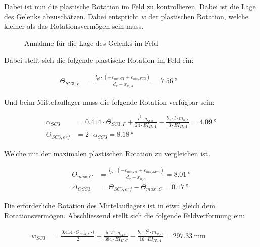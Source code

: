 \documentclass[
  11pt,
  letterpaper,
]{scrreprt}
\begin{document}
Dabei ist nun die plastische Rotation im Feld zu kontrollieren. Dabei
ist die Lage des Gelenks abzuschätzen. Dabei entspricht \(w\) der
plastischen Rotation, welche kleiner als das Rotationsvermögen sein
muss.

\begin{figure}[H]


\caption{\label{fig-jag_plast_feld_C}Annahme für die Lage des Gelenks im
Feld}

\end{figure}%

Dabei stellt sich die folgende plastische Rotation im Feld ein:

\[
\begin{aligned}
\Theta_{SC3 , F}& = \frac{l_{pl} \cdot \left(- \varepsilon_{m s , C1} + \varepsilon_{m s , SC3}\right)}{d_{x} - x_{u , A}} = 7.56 \ \mathrm{°} \quad &  \quad &  
 \end{aligned}
\]

Und beim Mittelauflager muss die folgende Rotation verfügbar sein:

\[
\begin{aligned}
\alpha_{SC3}& = 0.414 \cdot \Theta_{SC3 , F} + \frac{l^{3} \cdot q_{SC3}}{24 \cdot EI_{II , A}} - \frac{b_{w} \cdot l \cdot m_{u , C}}{3 \cdot EI_{II , A}} = 4.09 \ \mathrm{°} \\ 
\Theta_{SC3 , erf}& = 2 \cdot \alpha_{SC3} = 8.18 \ \mathrm{°} \end{aligned}
\]

Welche mit der maximalen plastischen Rotation zu vergleichen ist.

\[
\begin{aligned}
\Theta_{max , C}& = \frac{l_{pl} \cdot \left(- \varepsilon_{m s , C1} + \varepsilon_{m s , adm}\right)}{d_{x} - x_{u , C}} = 8.01 \ \mathrm{°} \\ 
\Delta_{\Theta SC3}& = \Theta_{SC3 , erf} - \Theta_{max , C} = 0.17 \ \mathrm{°} \end{aligned}
\]

Die erforderliche Rotation des Mittelauflagers ist in etwa gleich dem
Rotationsvermögen. Abschliessend stellt sich die folgende Feldverformung
ein:

\[
\begin{aligned}
w_{SC3}& = \frac{0.414 \cdot \Theta_{SC3 , F} \cdot l}{2} + \frac{5 \cdot l^{4} \cdot q_{SC3}}{384 \cdot EI_{II , C}} - \frac{b_{w} \cdot l^{2} \cdot m_{u , C}}{16 \cdot EI_{II , A}} = 297.33 \ \mathrm{mm} \quad &  \quad &  
 \end{aligned}
\]
\end{document}
